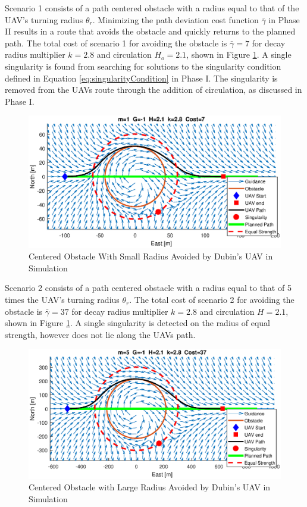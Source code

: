 \documentclass[numbered,pdftex]{ohio-etd}
\begin{document}
Scenario 1 consists of a path centered obstacle with a radius equal to that of the UAV's turning radius $\theta_r$. Minimizing the path deviation cost function  $\bar{\gamma}$ in Phase II results in a route that avoids the obstacle and quickly returns to the planned path. The total cost of scenario 1 for avoiding the obstacle is $\bar{\gamma}=7$ for decay radius multiplier $k=2.8$ and circulation $H_o = 2.1$, shown in Figure \ref{fig:m1y0solved}. A single singularity is found from searching for solutions to the singularity condition defined in Equation \ref{eq:singularityCondition} in Phase I. The singularity is removed from the UAVs route through the addition of circulation, as discussed in Phase I.

\begin{figure}[H]
	\centering
	\includegraphics[trim = 0 85 0 85, clip, width=16cm]{Figures/results/m1Y0Solved}
	\caption{Centered Obstacle With Small Radius Avoided by Dubin's UAV in Simulation}
	\label{fig:m1y0solved}
\end{figure}

Scenario 2 consists of a path centered obstacle with a radius equal to that of 5 times the UAV's turning radius $\theta_r$. The total cost of scenario 2 for avoiding the obstacle is $\bar{\gamma}=37$ for decay radius multiplier $k=2.8$ and circulation $H = 2.1$, shown in Figure \ref{fig:m1y0solved}. A single singularity is detected on the radius of equal strength, however does not lie along the UAVs path.


\begin{figure}[H]
	\centering
	\includegraphics[trim = 0 85 0 85, clip, width=16cm]{Figures/results/m5Y0Solved}
	\caption{Centered Obstacle with Large Radius Avoided by Dubin's UAV in Simulation}
	\label{fig:m5y0solved}
\end{figure}
\end{document}
